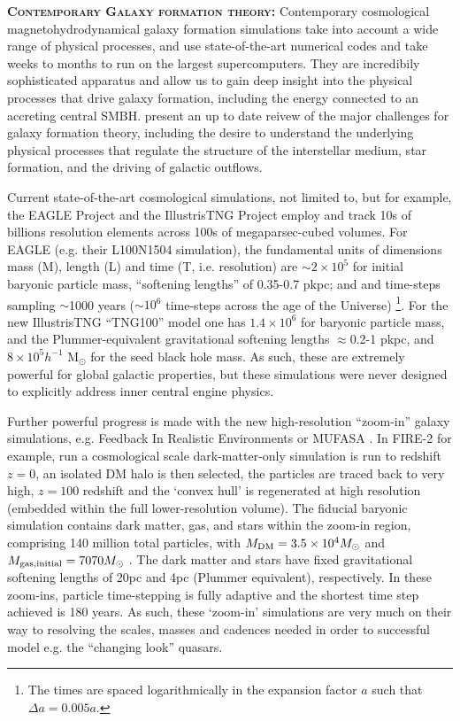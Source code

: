 \smallskip
\smallskip
\noindent
\textbf{\textsc{Contemporary Galaxy formation theory:}}
Contemporary cosmological magnetohydrodynamical galaxy formation
simulations take into account a wide range of physical processes, and
use state-of-the-art numerical codes and take weeks to months to run
on the largest supercomputers.  They are incredibily sophisticated
apparatus and allow us to gain deep insight into the physical
processes that drive galaxy formation, including the energy connected
to an accreting central SMBH. \citet{NaabOstriker2017} present an up
to date reivew of the major challenges for galaxy formation theory,
including the desire to understand the underlying physical processes
that regulate the structure of the interstellar medium, star
formation, and the driving of galactic outflows.

\smallskip
\smallskip
\noindent
Current state-of-the-art cosmological simulations, not limited to,
but for example, the EAGLE Project \citep{Schaye2015, Crain2015} and
the IllustrisTNG Project \citep{Pillepich2018} employ and track 10s of
billions resolution elements across 100s of megaparsec-cubed volumes.
For EAGLE (e.g. their L100N1504 simulation), the fundamental units of
dimensions mass (M), length (L) and time (T, i.e. resolution) are
$\sim2\times10^{5}$ for initial baryonic particle mass, ``softening
lengths'' of 0.35-0.7 pkpc; and and time-steps sampling $\sim$1000
years ($\sim10^{6}$ time-steps across the age of the Universe)
\footnote{The times are spaced logarithmically in the expansion factor
$a$ such that $\Delta a = 0.005a$.}.  For the new IllustrisTNG
``TNG100'' model one has $1.4\times10^{6}$ for baryonic particle mass,
and the Plummer-equivalent gravitational softening lengths
$\approx$0.2-1 pkpc, and $8\times10^{5} h^{-1}$ M$_{\odot}$ for the
seed black hole mass.  As such, these are extremely powerful for
global galactic properties, but these simulations were never designed
to explicitly address inner central engine physics.

\smallskip
\smallskip
\noindent
Further powerful progress is made with the new high-resolution
``zoom-in'' galaxy simulations, e.g. Feedback In Realistic
Environments \citep[FIRE-2; ][]{Wetzel2016, Hopkins2017} or MUFASA
\citep[][]{Dave2016}.  In FIRE-2 for example, \citet{Wetzel2016} run a
cosmological scale dark-matter-only simulation is run to redshift
$z=0$, an isolated DM halo is then selected, the particles are traced
back to very high, $z=100$ redshift and the `convex hull' is
regenerated at high resolution (embedded within the full
lower-resolution volume).  The fiducial baryonic simulation contains
dark matter, gas, and stars within the zoom-in region, comprising 140
million total particles, with $M_{\rm DM} =3.5\times10^{4} M_{\odot}$
and $M_{\rm gas,initial} = 7070 M_{\odot}$ .  The dark matter and
stars have fixed gravitational softening lengths of 20pc and 4pc
(Plummer equivalent), respectively.  In these zoom-ins, particle
time-stepping is fully adaptive and the shortest time step achieved is
180 years.  As such, these `zoom-in' simulations are very much on
their way to resolving the scales, masses and cadences needed in order
to successful model e.g. the ``changing look'' quasars.

